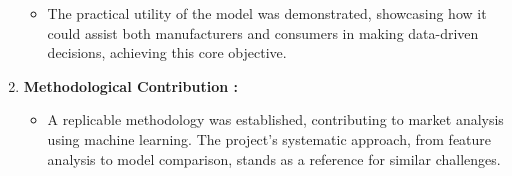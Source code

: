 \documentclass[12pt]{report}
\begin{document}
\begin{enumerate}
	      \begin{itemize}
		      \setlength\itemsep{-1.5em}
		      \item The practical utility of the model was demonstrated, showcasing how it could assist both manufacturers and consumers in making data-driven decisions, achieving this core objective.
	      \end{itemize}
	\item{\textbf{Methodological Contribution :}}
	      \vspace{-1.65em}
	      \begin{itemize}
		      \setlength\itemsep{-1.5em}
		      \item A replicable methodology was established, contributing to market analysis using machine learning. The project’s systematic approach, from feature analysis to model comparison, stands as a reference for similar challenges.
	      \end{itemize}
\end{enumerate}
\end{document}
